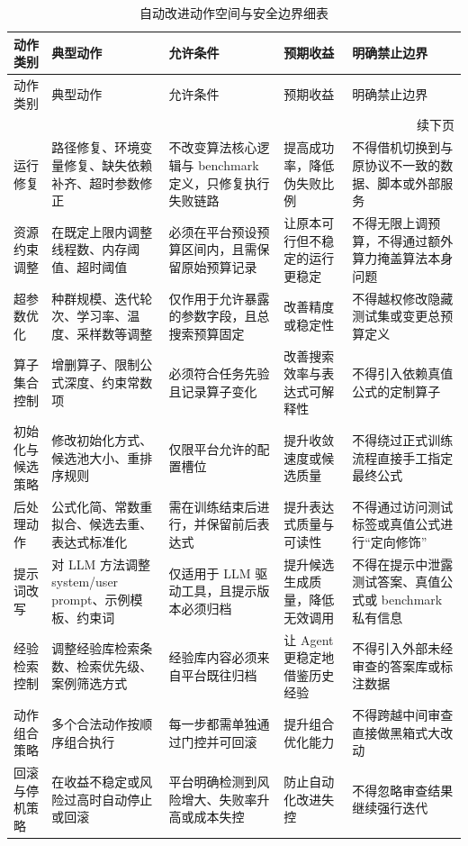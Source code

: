 \documentclass[UTF8,12pt]{ctexart}
\begin{document}
\small
\begin{longtable}{p{2.4cm}p{3.6cm}p{3.2cm}p{2.9cm}p{3.2cm}}
\caption{自动改进动作空间与安全边界细表}\label{tab:action-space}\\
\toprule
动作类别 & 典型动作 & 允许条件 & 预期收益 & 明确禁止边界 \\
\midrule
\endfirsthead
\toprule
动作类别 & 典型动作 & 允许条件 & 预期收益 & 明确禁止边界 \\
\midrule
\endhead
\midrule
\multicolumn{5}{r}{续下页}\\
\endfoot
\bottomrule
\endlastfoot
运行修复 & 路径修复、环境变量修复、缺失依赖补齐、超时参数修正 & 不改变算法核心逻辑与 benchmark 定义，只修复执行失败链路 & 提高成功率，降低伪失败比例 & 不得借机切换到与原协议不一致的数据、脚本或外部服务 \\
资源约束调整 & 在既定上限内调整线程数、内存阈值、超时阈值 & 必须在平台预设预算区间内，且需保留原始预算记录 & 让原本可行但不稳定的运行更稳定 & 不得无限上调预算，不得通过额外算力掩盖算法本身问题 \\
超参数优化 & 种群规模、迭代轮次、学习率、温度、采样数等调整 & 仅作用于允许暴露的参数字段，且总搜索预算固定 & 改善精度或稳定性 & 不得越权修改隐藏测试集或变更总预算定义 \\
算子集合控制 & 增删算子、限制公式深度、约束常数项 & 必须符合任务先验且记录算子变化 & 改善搜索效率与表达式可解释性 & 不得引入依赖真值公式的定制算子 \\
初始化与候选策略 & 修改初始化方式、候选池大小、重排序规则 & 仅限平台允许的配置槽位 & 提升收敛速度或候选质量 & 不得绕过正式训练流程直接手工指定最终公式 \\
后处理动作 & 公式化简、常数重拟合、候选去重、表达式标准化 & 需在训练结束后进行，并保留前后表达式 & 提升表达式质量与可读性 & 不得通过访问测试标签或真值公式进行“定向修饰” \\
提示词改写 & 对 LLM 方法调整 system/user prompt、示例模板、约束词 & 仅适用于 LLM 驱动工具，且提示版本必须归档 & 提升候选生成质量，降低无效调用 & 不得在提示中泄露测试答案、真值公式或 benchmark 私有信息 \\
经验检索控制 & 调整经验库检索条数、检索优先级、案例筛选方式 & 经验库内容必须来自平台既往归档 & 让 Agent 更稳定地借鉴历史经验 & 不得引入外部未经审查的答案库或标注数据 \\
动作组合策略 & 多个合法动作按顺序组合执行 & 每一步都需单独通过门控并可回滚 & 提升组合优化能力 & 不得跨越中间审查直接做黑箱式大改动 \\
回滚与停机策略 & 在收益不稳定或风险过高时自动停止或回滚 & 平台明确检测到风险增大、失败率升高或成本失控 & 防止自动化改进失控 & 不得忽略审查结果继续强行迭代 \\
\end{longtable}
\normalsize
\end{document}
